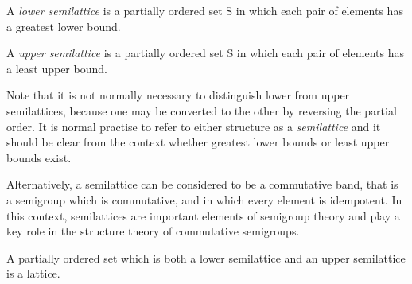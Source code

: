 \documentclass[12pt]{article}
\begin{document}
A \emph{lower semilattice} is a partially ordered set S in which each pair of elements has a greatest lower bound.

A \emph{upper semilattice} is a partially ordered set S in which each pair of elements has a least upper bound.

Note that it is not normally necessary to distinguish lower from upper semilattices, because one may be converted to the other by reversing the partial order.  It is normal practise to refer to either structure as a \emph{semilattice} and it should be clear from the context whether greatest lower bounds or least upper bounds exist.

Alternatively, a semilattice can be considered to be a commutative band, that is a semigroup which is commutative, and in which every element is idempotent.  In this context, semilattices are important elements of semigroup theory and play a key role in the structure theory of commutative semigroups.

A partially ordered set which is both a lower semilattice and an upper semilattice is a lattice.
\end{document}
